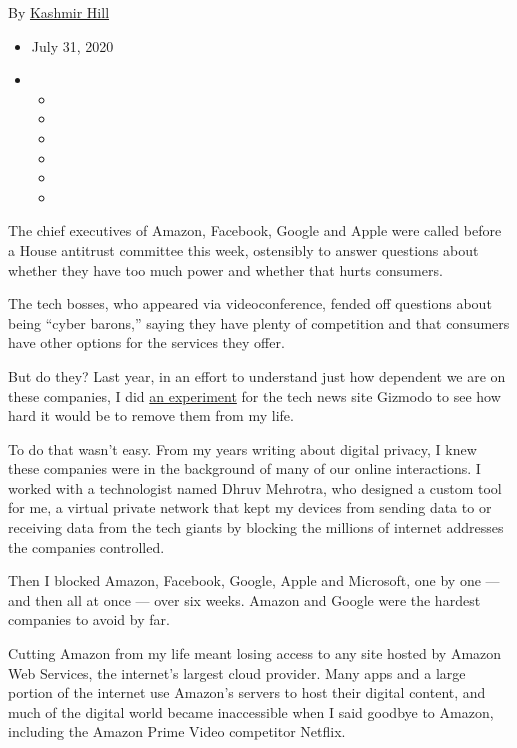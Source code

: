By \href{https://www.nytimes3xbfgragh.onion/by/kashmir-hill}{Kashmir
Hill}

\begin{itemize}
\item
  July 31, 2020
\item
  \begin{itemize}
  \item
  \item
  \item
  \item
  \item
  \item
  \end{itemize}
\end{itemize}

The chief executives of Amazon, Facebook, Google and Apple were called
before a House antitrust committee this week, ostensibly to answer
questions about whether they have too much power and whether that hurts
consumers.

The tech bosses, who appeared via videoconference, fended off questions
about being ``cyber barons,'' saying they have plenty of competition and
that consumers have other options for the services they offer.

But do they? Last year, in an effort to understand just how dependent we
are on these companies, I did
\href{https://gizmodo.com/c/goodbye-big-five}{an experiment} for the
tech news site Gizmodo to see how hard it would be to remove them from
my life.

To do that wasn't easy. From my years writing about digital privacy, I
knew these companies were in the background of many of our online
interactions. I worked with a technologist named Dhruv Mehrotra, who
designed a custom tool for me, a virtual private network that kept my
devices from sending data to or receiving data from the tech giants by
blocking the millions of internet addresses the companies controlled.

Then I blocked Amazon, Facebook, Google, Apple and Microsoft, one by one
--- and then all at once --- over six weeks. Amazon and Google were the
hardest companies to avoid by far.

Cutting Amazon from my life meant losing access to any site hosted by
Amazon Web Services, the internet's largest cloud provider. Many apps
and a large portion of the internet use Amazon's servers to host their
digital content, and much of the digital world became inaccessible when
I said goodbye to Amazon, including the Amazon Prime Video competitor
Netflix.

